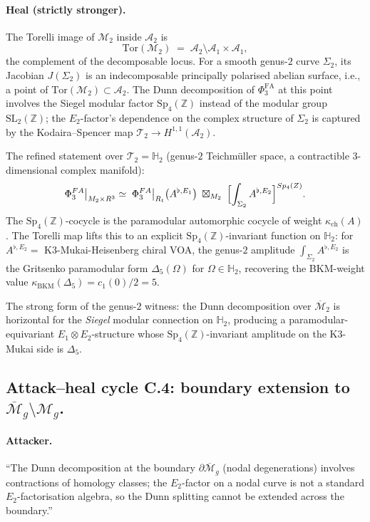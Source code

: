 \documentclass[11pt]{article}
\newcommand{\Eone}{E_{1}}
\newcommand{\Etwo}{E_{2}}
\newcommand{\PhiFA}{\Phi^{\mathrm{FA}}}
\newcommand{\R}{\mathbb{R}}
\newcommand{\Z}{\mathbb{Z}}
\newcommand{\cA}{\mathcal{A}}
\newcommand{\cM}{\mathcal{M}}
\newcommand{\cT}{\mathcal{T}}
\newcommand{\Tor}{\mathrm{Tor}}
\begin{document}
\paragraph{Heal (strictly stronger).}
The Torelli image of $\cM_2$ inside $\cA_2$ is
\[
  \Tor(\cM_2) \;=\; \cA_2 \setminus \cA_1 \times \cA_1,
\]
the complement of the decomposable locus. For a smooth genus-$2$ curve
$\Sigma_2$, its Jacobian $J(\Sigma_2)$ is an indecomposable principally
polarised abelian surface, i.e., a point of $\Tor(\cM_2) \subset \cA_2$.
The Dunn decomposition of $\PhiFA_3$ at this point involves the
Siegel modular factor $\mathrm{Sp}_4(\Z)$ instead of the modular group
$\mathrm{SL}_2(\Z)$; the $\Etwo$-factor's dependence on the complex
structure of $\Sigma_2$ is captured by the Kodaira--Spencer map
$\cT_2 \to H^{1,1}(\cA_2)$.

The refined statement over $\cT_2 = \mathbb H_2$ (genus-$2$ Teichm\"uller
space, a contractible $3$-dimensional complex manifold):
\[
  \PhiFA_3\bigl|_{\overline{\cM}_2 \times \R^3}
  \;\simeq\;
  \PhiFA_3\bigl|_{\R_t}\bigl(A^{\flat, \Eone}\bigr)
  \;\boxtimes_{\overline{\cM}_2}\;
  \Bigl[\int_{\Sigma_2} A^{\flat, \Etwo}\Bigr]^{\mathrm{Sp}_4(\Z)}.
\]
The $\mathrm{Sp}_4(\Z)$-cocycle is the paramodular automorphic
cocycle of weight $\kappa_{\mathrm{ch}}(A)$. The Torelli map lifts
this to an explicit $\mathrm{Sp}_4(\Z)$-invariant function on
$\mathbb H_2$: for $A^{\flat, \Etwo} = $ K3-Mukai-Heisenberg chiral VOA,
the genus-$2$ amplitude $\int_{\Sigma_2} A^{\flat, \Etwo}$ is the
Gritsenko paramodular form $\Delta_5(\Omega)$ for $\Omega \in \mathbb
H_2$, recovering the BKM-weight value
$\kappa_{\mathrm{BKM}}(\Delta_5) = c_1(0)/2 = 5$.

The strong form of the genus-$2$ witness: the Dunn decomposition over
$\overline{\cM}_2$ is horizontal for the \emph{Siegel} modular
connection on $\mathbb H_2$, producing a paramodular-equivariant
$\Eone \otimes \Etwo$-structure whose $\mathrm{Sp}_4(\Z)$-invariant
amplitude on the K3-Mukai side is $\Delta_5$.

\subsection{Attack--heal cycle C.4: boundary extension to
  $\overline{\cM}_g \setminus \cM_g$.}

\paragraph{Attacker.}
``The Dunn decomposition at the boundary $\partial\overline{\cM}_g$
(nodal degenerations) involves contractions of homology classes; the
$\Etwo$-factor on a nodal curve is not a standard
$\Etwo$-factorisation algebra, so the Dunn splitting cannot be
extended across the boundary.''
\end{document}
